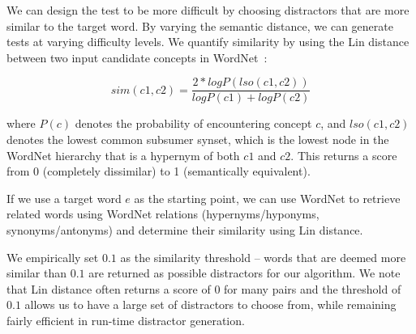 We can design the test to be more difficult by choosing distractors
that are more similar to the target word.  By varying the semantic
distance, we can generate tests at varying difficulty levels.  We
quantify similarity by using the Lin distance~\cite{Lin1998} between two
input candidate concepts in WordNet~\cite{Miller1995}:

\begin{equation}
sim(c1,c2) = \frac{2*log P(lso(c1,c2))}{log P(c1)+log P(c2)}
\label{equation:Distractor_4}
\end{equation}  

\noindent where $P(c)$ denotes the probability of encountering concept
$c$, and $lso(c1,c2)$ denotes the lowest common subsumer synset, which
is the lowest node in the WordNet hierarchy that is a hypernym of both
$c1$ and $c2$.  This returns a score from 0 (completely dissimilar) to
1 (semantically equivalent).

If we use a target word $e$ as the starting point, we can use WordNet
to retrieve related words using WordNet relations (hypernyms/hyponyms,
synonyms/antonyms) and determine their similarity using Lin distance.

We empirically set $0.1$ as the similarity threshold -- words that are
deemed more similar than $0.1$ are returned as possible distractors
for our algorithm.  We note that Lin distance often returns a score of
0 for many pairs and the threshold of $0.1$ allows us to have a large
set of distractors to choose from, while remaining fairly efficient in
run-time distractor generation.



